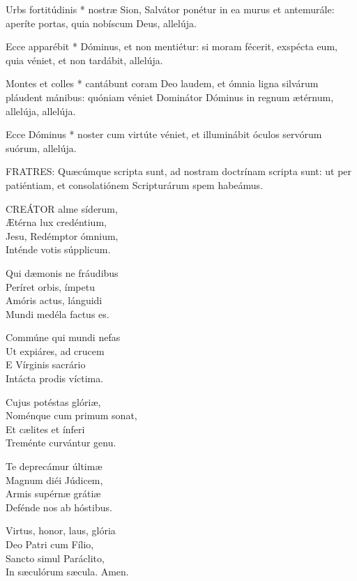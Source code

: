 
 Urbs fortitúdinis * nostræ Sion, Salvátor ponétur in ea murus et antemurále: aperíte portas, quia nobíscum Deus, allelúja.

 Ecce apparébit * Dóminus, et non mentiétur: si moram fécerit, exspécta eum, quia véniet, et non tardábit, allelúja.

 Montes et colles * cantábunt coram Deo laudem, et ómnia ligna silvárum pláudent mánibus: quóniam véniet Dominátor Dóminus in regnum ætérnum, allelúja, allelúja.

 Ecce Dóminus * noster cum virtúte véniet, et illuminábit óculos servórum suórum, allelúja.


\lettrine[lines=2]{F}{RATRES}: Quæcúmque scripta sunt, ad nostram doctrínam scripta sunt: ut per patiéntiam, et consolatiónem Scripturárum spem habeámus.


\lettrine[lines=2]{C}{REÁTOR} alme síderum,\\
Ætérna lux credéntium,\\
Jesu, Redémptor ómnium,\\
Inténde votis súpplicum.

Qui dæmonis ne fráudibus\\
Períret orbis, ímpetu\\
Amóris actus, lánguidi\\
Mundi medéla factus es.

Commúne qui mundi nefas\\
Ut expiáres, ad crucem\\
E Vírginis sacrário\\
Intácta prodis víctima.

Cujus potéstas glóriæ,\\
Noménque cum primum sonat,\\
Et cælites et ínferi\\
Treménte curvántur genu.

Te deprecámur últimæ\\
Magnum diéi Júdicem,\\
Armis supérnæ grátiæ\\
Defénde nos ab hóstibus.

Virtus, honor, laus, glória\\
Deo Patri cum Fílio,\\
Sancto simul Paráclito,\\
In sæculórum sæcula. Amen.

